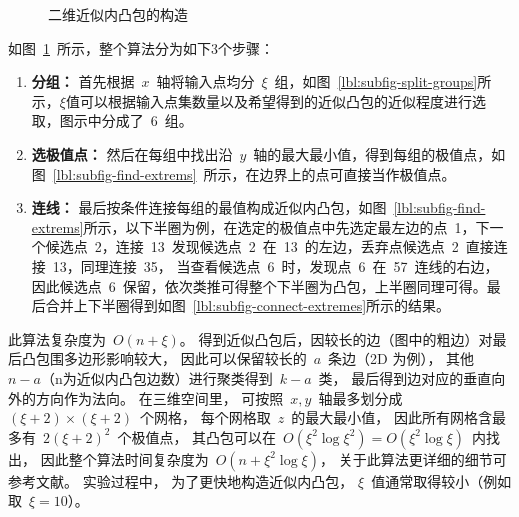 \begin{figure}[htbp]
  \centering
   \hspace{0.5cm}
  \linebreak
   \hspace{0.5cm}
  \hspace{2em}
   \hspace{0.5cm}
  \caption{二维近似内凸包的构造\cite{bentley1982approximation}}
\label{lbl:ach-2d}
\end{figure}

如图~\ref{lbl:ach-2d}~所示，整个算法分为如下3个步骤：

\begin{enumerate}[(1)]
\item \textbf{分组：}
首先根据~$x$~轴将输入点均分~$\xi$~组，如图~\ref{lbl:subfig-split-groups}所示，$\xi$值可以根据输入点集数量以及希望得到的近似凸包的近似程度进行选取，图示中分成了~6~组。
\item \textbf{选极值点：}
然后在每组中找出沿~$y$~轴的最大最小值，得到每组的极值点，如图~\ref{lbl:subfig-find-extrems}~所示，在边界上的点可直接当作极值点。
\item \textbf{连线：}
最后按条件连接每组的最值构成近似内凸包，如图~\ref{lbl:subfig-find-extrems}所示，以下半圈为例，在选定的极值点中先选定最左边的点~1，下一个候选点~2，连接~13~发现候选点~2~在~13~的左边，丢弃点候选点~2~直接连接~13，同理连接~35，
当查看候选点~6~时，发现点~6~在~57~连线的右边，因此候选点~6~保留，依次类推可得整个下半圈为凸包，上半圈同理可得。最后合并上下半圈得到如图~\ref{lbl:subfig-connect-extremes}所示的结果。
\end{enumerate}
此算法复杂度为~$O(n+\xi)$。  
得到近似凸包后，因较长的边（图中的粗边）对最后凸包围多边形影响较大， 因此可以保留较长的~$a$~条边（2D 为例）， 其他~$n-a$（n为近似内凸包边数）进行聚类得到~$k-a$~类， 最后得到边对应的垂直向外的方向作为法向。
在三维空间里， 可按照~$x,y$~轴最多划分成~$(\xi+2)\times (\xi+2)$~个网格， 每个网格取~$z$~的最大最小值， 因此所有网格含最多有~$2(\xi+2)^2$~个极值点， 其凸包可以在~$O(\xi^2\log \xi^2) = O(\xi^2\log \xi)$~内找出， 因此整个算法时间复杂度为~$O(n+\xi^2\log\xi)$， 
关于此算法更详细的细节可参考文献。 实验过程中， 为了更快地构造近似内凸包， $\xi$~值通常取得较小（例如取~$\xi=10$）。

